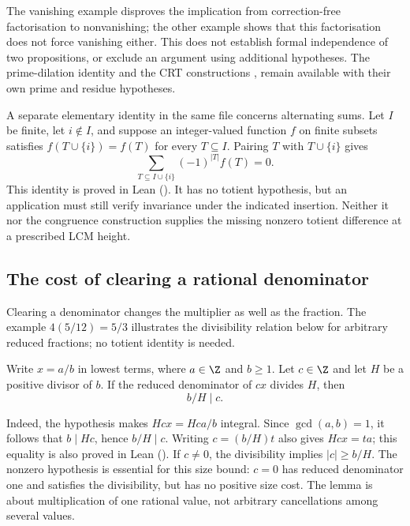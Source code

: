 The vanishing example disproves the implication from correction-free
factorisation to nonvanishing; the other example shows that this
factorisation does not force vanishing either. This does not establish
formal independence of two propositions, or exclude an argument using
additional hypotheses. The prime-dilation identity
and the CRT constructions
,
remain available with their own prime and residue hypotheses.

A separate elementary identity in the same file concerns alternating
sums. Let $I$ be finite, let $i\notin I$, and suppose an
integer-valued function $f$ on finite subsets satisfies
$f(T\cup\{i\})=f(T)$ for every $T\subseteq I$. Pairing $T$ with
$T\cup\{i\}$ gives
\[
 \sum_{T\subseteq I\cup\{i\}}(-1)^{|T|}f(T)=0.
\]
This identity is proved in Lean
().
It has no totient hypothesis, but an application must still verify
invariance under the indicated insertion. Neither it nor the congruence
construction supplies the missing nonzero totient difference at a
prescribed LCM height.

\subsection{The cost of clearing a rational denominator}
\label{sec:adelic-height}

Clearing a denominator changes the multiplier as well as the
fraction. The example $4(5/12)=5/3$ illustrates the divisibility
relation below for arbitrary reduced fractions; no totient identity
is needed.

\begin{lem}\label{lem:complement-divisibility-after-multiplication}
Write $x=a/b$ in lowest terms, where $a\in\Z$ and $b\ge1$. Let
$c\in\Z$ and let $H$ be a positive divisor of $b$. If the reduced
denominator of $cx$ divides $H$, then
\[
 b/H\mid c.
\]
\end{lem}
Indeed, the hypothesis makes $Hcx=Hca/b$ integral. Since
$\gcd(a,b)=1$, it follows that $b\mid Hc$, hence $b/H\mid c$.
Writing $c=(b/H)t$ also gives $Hcx=ta$; this equality is also proved in
Lean ().
If $c\ne0$, the divisibility implies $|c|\ge b/H$. The nonzero
hypothesis is essential for this size bound: $c=0$ has reduced
denominator one and satisfies the divisibility, but has no positive
size cost. The lemma is about multiplication of one rational value,
not arbitrary cancellations among several values.


